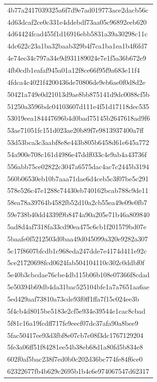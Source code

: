 \begin{tabular}{l}
4b77a2417039325a6f7d9e7ad019773ace2dacb56c \\
4d63dcaf2ce0c331e4ddebdf73aa05c96892eeb620 \\
4d64424fcad455f1d16916ebb5831a39a30298c11c \\
4dc622c23a1ba32baab329b4f7ca1ba1ea1b4f6fd7 \\
4e74ec34c797a34e9d931189024e7e1f5a36b672e9 \\
4fb0cdb1eafaf945a01a12f8ce66f95f9a683e11f4 \\
4fdca4c4021f4200436de70806de9eb6ae0f0d8d2e \\
50421a749e0d21013d9ae8bb875141d9dc0088cf5b \\
51250a3596bdc04103607d111e4f51d17118dec535 \\
53019eea184447696b4d0bad75145b2647618ad9f6 \\
53ae71051fc151d023ae20b89f7e9813937400a7ff \\
53d53bca3c3aabf8e8e443b805b6458d61e645a772 \\
54a900e708c161d4986e47ddf033c4e9ab4a43736f \\
556abb75ce02822c3047a6575dac4ac7c2445b3194 \\
560b06530eb10b7aaa71dae6d4ceb5c3f07be5c291 \\
578e526c47e1288c74430eb740162bcab788c9de11 \\
58ea78a39764b4582fb52d10a2cb55ea49e09e0fb7 \\
59e738b40dd4339f9b8474a90a205e71b46a809840 \\
5ad8d4af7318fa33cd90ea475c6cb1f201579bd07e \\
5baafe0f5212503d0baa49d045099a320e9282a307 \\
5c17f8607bfcdb1c968eda247dde7e4174d411e92c \\
5ce21720698fcd0624fab504104110c302c0ddbf0f \\
5e40b3cbcdae76cbe4db115b06b108e07366f8cdad \\
5e50394b69db4da31bac525104bfe1a7a7651aa6ae \\
5ed429aaf73810a73cde93f0ff1ffa7f15c024ee3b \\
5f4cb4d8015be5183e2cf5e934e39544e1cac8cbad \\
5f81c16a19fcdff717fe9eecf07dc37afa90a8bee9 \\
5fac50417ee93d3fbf8e07cb7e08f3dc1767129204 \\
5fe3a06ff51f84281ee54b38eb68d1a80fd5b834e8 \\
602f0af5bac238f7ed0b0c202d36bc774fe84f6ce0 \\
62322677fb4b629c2695b1b4c6e974067547d62317 \\

\end{tabular}

